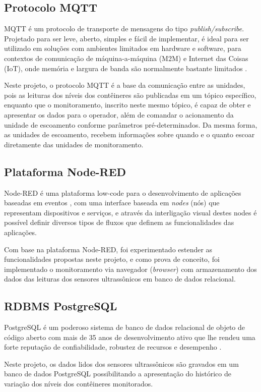 \subsection{Protocolo MQTT}
MQTT é um protocolo de transporte de mensagens do tipo \textit{publish/subscribe}. Projetado para ser leve, aberto, simples e fácil de implementar, é ideal para ser utilizado em soluções com ambientes limitados em hardware e software, para contextos de comunicação de máquina-a-máquina (M2M) e Internet das Coisas (IoT), onde memória e largura de banda são normalmente bastante limitados \cite{mqtt}.

Neste projeto, o protocolo MQTT é a base da comunicação entre as unidades, pois as leituras dos níveis dos contêineres são publicadas em um tópico específico, enquanto que o monitoramento, inscrito neste mesmo tópico, é capaz de obter e apresentar os dados para o operador, além de comandar o acionamento da unidade de escoamento conforme parâmetros pré-determinados. Da mesma forma, as unidades de escoamento, recebem informações sobre quando e o quanto escoar diretamente das unidades de monitoramento.

\subsection{Plataforma Node-RED}
Node-RED é uma plataforma low-code \cite{ibm-lowcode} para o desenvolvimento de aplicações baseadas em eventos \cite{nodered}, com uma interface baseada em \textit{nodes} (nós) que representam dispositivos e serviços, e através da interligação visual destes nodes é possível definir diversos tipos de fluxos que definem as funcionalidades das aplicações.

Com base na plataforma Node-RED, foi experimentado estender as funcionalidades propostas neste projeto, e como prova de conceito, foi implementado o monitoramento via navegador (\textit{browser}) com armazenamento dos dados das leituras dos sensores ultrassônicos em banco de dados relacional.

\subsection{RDBMS PostgreSQL}
PostgreSQL é um poderoso sistema de banco de dados relacional de objeto de código aberto com mais de 35 anos de desenvolvimento ativo que lhe rendeu uma forte reputação de confiabilidade, robustez de recursos e desempenho \cite{postgresql}.

Neste projeto, os dados lidos dos sensores ultrassônicos são gravados em um banco de dados PostgreSQL possibilitando a apresentação do histórico de variação dos níveis dos contêineres monitorados.

\clearpage